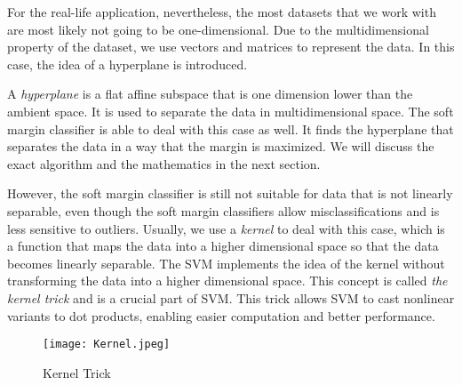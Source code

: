 For the real-life application, nevertheless, the most datasets that we work with are
most likely not going to be one-dimensional. Due to the multidimensional property of the dataset,
we use vectors and matrices to represent the data. In this case, the idea of a hyperplane is introduced. 

A \emph{hyperplane} is a flat affine subspace that is one dimension lower than the ambient space.\cite{R9}
It is used to separate the data in multidimensional space. The soft margin classifier is able to deal with this case as well.
It finds the hyperplane that separates the data in a way that the margin is maximized. We will discuss the exact algorithm and the
mathematics in the next section.

However, the soft margin classifier is still not suitable for data that is not linearly separable, even though 
the soft margin classifiers allow misclassifications and is less sensitive to outliers. Usually, we use a \emph{kernel} to deal 
with this case, which is a function that maps the data into a higher dimensional space so that the data becomes linearly
separable. The SVM implements the idea of the kernel without transforming the data into a higher dimensional space. This concept is 
called \emph{the kernel trick} and is a crucial part of SVM. This trick allows SVM to cast nonlinear variants to dot products,
enabling easier computation and better performance. \cite{Kernel2}
\begin{figure}[h]%
    \begin{center}%
        \texttt{[image: Kernel.jpeg]}%
        \caption{Kernel Trick \cite{imgintro}}\label{fig:}%
    \end{center}%
\end{figure}
